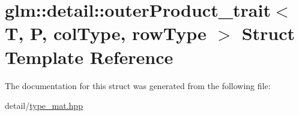 \hypertarget{structglm_1_1detail_1_1outerProduct__trait}{\section{glm\-:\-:detail\-:\-:outer\-Product\-\_\-trait$<$ T, P, col\-Type, row\-Type $>$ Struct Template Reference}
\label{structglm_1_1detail_1_1outerProduct__trait}
}


The documentation for this struct was generated from the following file\-:\begin{DoxyCompactItemize}
\item 
detail/\hyperlink{type__mat_8hpp}{type\-\_\-mat.\-hpp}\end{DoxyCompactItemize}
